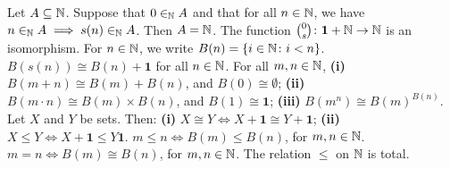  Let $A \subseteq \operatorname{\mathbb{N}}$. Suppose that $0 \in_{\operatorname{\mathbb{N}}} A$ and that for all $n \in \operatorname{\mathbb{N}}$, we have $n \in_{\operatorname{\mathbb{N}}} A \implies s(n) \in_{\operatorname{\mathbb{N}}} A$. Then $A = \operatorname{\mathbb{N}}$.
 The function $\binom{0}{s} \colon \mathbf{1} + \operatorname{\mathbb{N}} \to \operatorname{\mathbb{N}}$ is an isomorphism.
 For $n \in \operatorname{\mathbb{N}}$, we write $B(n) = \{ i \in \operatorname{\mathbb{N}} \colon i < n \}$.
 $B(s(n)) \cong B(n) + \mathbf{1}$ for all $n \in \operatorname{\mathbb{N}}$.
 For all $m, n \in \operatorname{\mathbb{N}}$, \textbf{(i)} $B(m + n) \cong B(m) + B(n)$, and $B(0) \cong \emptyset$; \textbf{(ii)} $B(m \cdot n) \cong B(m) \times B(n)$, and $B(1) \cong \mathbf{1}$; \textbf{(iii)} $B(m^n) \cong B(m)^{B(n)}$.
 Let $X$ and $Y$ be sets. Then: \textbf{(i)} $X \cong Y \iff X + \mathbf{1} \cong Y + \mathbf{1}$; \textbf{(ii)} $X \leq Y \iff X + \mathbf{1} \leq Y \mathbf{1}$.
 $m \leq n \iff B(m) \leq B(n)$, for $m, n \in \operatorname{\mathbb{N}}$.
 $m = n \iff B(m) \cong B(n)$, for $m, n \in \operatorname{\mathbb{N}}$.
 The relation $\leq$ on $\operatorname{\mathbb{N}}$ is total.
